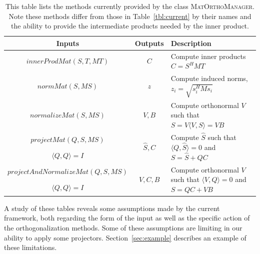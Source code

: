 \documentclass[12pt,letterpaper]{SANDreport}
\theoremstyle{example}
\newcommand{\inner}[2]{\langle #1,#2 \rangle}
\begin{document}
\begin{table}[ht]
  \centering
  \caption[Current Ortho. Methods]{This table lists the 
  methods currently provided by the class \textsc{MatOrthoManager}. Note these methods
  differ from those in Table~\ref{tbl:current} by their names and the ability to provide
  the intermediate products needed by the inner product.}
  \begin{tabular}{|c|c|l|}
    \hline \hline
    Inputs                       & Outputs     & Description \\ \hline 

    \multirow{2}{*}{$innerProdMat(S,T,MT)$}         & \multirow{2}{*}{$C$}
    & \multirow{2}{7cm}{Compute inner products $C = S^H M T$} \\
    & & \\\hline

    \multirow{2}{*}{$normMat(S,MS)$}         & \multirow{2}{*}{$z$}
    & \multirow{2}{7cm}{Compute induced norms, $z_i = \sqrt{s_i^H M s_i}$} \\
    & & \\\hline

    \multirow{2}{*}{$normalizeMat(S,MS)$}         & \multirow{2}{*}{$V,B$}
    & \multirow{2}{7cm}{Compute orthonormal $V$ such that $S = V\inner{V}{S} = VB$} \\ 
    & & \\\hline

    $projectMat(Q,S,MS)$         & \multirow{2}{*}{$\hat{S},C$}
    & \multirow{2}{7cm}{Compute $\hat{S}$ such that $\inner{Q}{\hat{S}} = 0$ and $S = \hat{S} + QC$} \\
    $\inner{Q}{Q}=I$ & & \\\hline

    $projectAndNormalizeMat(Q,S,MS)$ & \multirow{2}{*}{$V,C,B$}
    & \multirow{2}{7cm}{Compute orthonormal $V$ such that $\inner{V}{Q}=0$ and $S = QC+VB$} \\
    $\inner{Q}{Q}=I$ & & \\\hline

    \hline
  \end{tabular}
  \label{tbl:currentMat}
\end{table}



A study of these tables reveals some assumptions made by the current framework, both
regarding the form of the input as well as the specific action of the orthogonalization
methods. Some of these assumptions are limiting in our ability to apply some projectors.
Section~\ref{sec:example} describes an example of these limitations.
\end{document}
